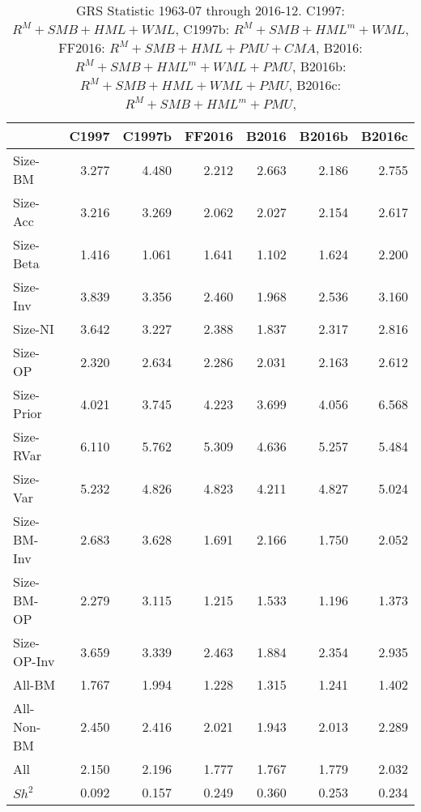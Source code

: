 
\begin{table}[!ht]
\centering
\caption{GRS Statistic 1963-07 through 2016-12.
    \footnotesize{
C1997:  $R^M + SMB + HML + WML$,
C1997b: $R^M + SMB + HML^m + WML$,
FF2016: $R^M + SMB + HML + PMU + CMA$,
B2016:  $R^M + SMB + HML^m + WML + PMU$,
B2016b: $R^M + SMB + HML + WML + PMU$,
B2016c: $R^M + SMB + HML^m + PMU$,
}}
\begin{tabular}{lrrrrrr}
  \toprule
     & C1997  & C1997b  & FF2016  & B2016  & B2016b  & B2016c  \\
  \midrule

  
    Size-BM  & 3.277  & 4.480  & 2.212  & 2.663  & 2.186  & 2.755  \\
  
    Size-Acc  & 3.216  & 3.269  & 2.062  & 2.027  & 2.154  & 2.617  \\
  
    Size-Beta  & 1.416  & 1.061  & 1.641  & 1.102  & 1.624  & 2.200  \\
  
    Size-Inv  & 3.839  & 3.356  & 2.460  & 1.968  & 2.536  & 3.160  \\
  
    Size-NI  & 3.642  & 3.227  & 2.388  & 1.837  & 2.317  & 2.816  \\
  
    Size-OP  & 2.320  & 2.634  & 2.286  & 2.031  & 2.163  & 2.612  \\
  
    Size-Prior  & 4.021  & 3.745  & 4.223  & 3.699  & 4.056  & 6.568  \\
  
    Size-RVar  & 6.110  & 5.762  & 5.309  & 4.636  & 5.257  & 5.484  \\
  
    Size-Var  & 5.232  & 4.826  & 4.823  & 4.211  & 4.827  & 5.024  \\
  
    Size-BM-Inv  & 2.683  & 3.628  & 1.691  & 2.166  & 1.750  & 2.052  \\
  
    Size-BM-OP  & 2.279  & 3.115  & 1.215  & 1.533  & 1.196  & 1.373  \\
  
    Size-OP-Inv  & 3.659  & 3.339  & 2.463  & 1.884  & 2.354  & 2.935  \\
  
    All-BM  & 1.767  & 1.994  & 1.228  & 1.315  & 1.241  & 1.402  \\
  
    All-Non-BM  & 2.450  & 2.416  & 2.021  & 1.943  & 2.013  & 2.289  \\
  
    All  & 2.150  & 2.196  & 1.777  & 1.767  & 1.779  & 2.032  \\
  
    $Sh^2$  & 0.092  & 0.157  & 0.249  & 0.360  & 0.253  & 0.234  \\
  

  \bottomrule
\end{tabular}
\label{tbl:GRS}
\end{table}